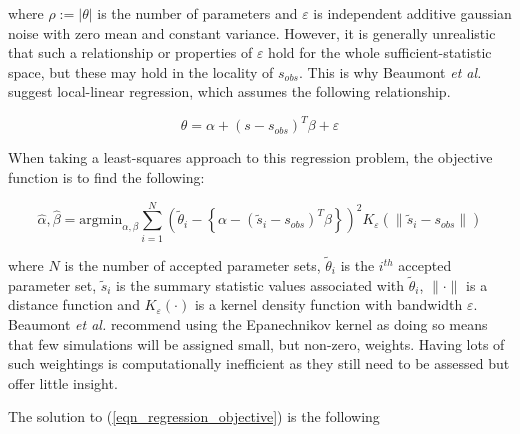 \documentclass[11pt,a4paper]{article}
\theoremstyle{break}
\begin{document}
  where $\rho:=|\theta|$ is the number of parameters and $\varepsilon$ is independent additive gaussian noise with zero mean and constant variance. However, it is generally unrealistic that such a relationship or properties of $\varepsilon$ hold for the whole sufficient-statistic space, but these may hold in the locality of $s_{obs}$. This is why Beaumont \textit{et al.} suggest local-linear regression, which assumes the following relationship.

  \[ \theta=\alpha+(s-s_{obs})^T\beta+\varepsilon \]

  \par When taking a least-squares approach to this regression problem, the objective function is to find the following:

  \begin{equation}\label{eqn_regression_objective}
    \hat\alpha,\hat\beta=\text{argmin}_{\alpha,\beta}\sum_{i=1}^N\left(\tilde\theta_i-\left\{\alpha-(\tilde{s}_i-s_{obs})^T\beta\right\}\right)^2K_\varepsilon\left(\|\tilde{s}_i-s_{obs}\|\right)
  \end{equation}

  where $N$ is the number of accepted parameter sets, $\tilde\theta_i$ is the $i^{th}$ accepted parameter set, $\tilde{s}_i$ is the summary statistic values associated with $\tilde\theta_i$, $\|\cdot\|$ is a distance function and $K_\varepsilon(\cdot)$ is a kernel density function with bandwidth $\varepsilon$. Beaumont \textit{et al.} recommend using the Epanechnikov kernel as doing so means that few simulations will be assigned small, but non-zero, weights. Having lots of such weightings is computationally inefficient as they still need to be assessed but offer little insight.

  \par The solution to (\ref{eqn_regression_objective}) is the following
\end{document}
